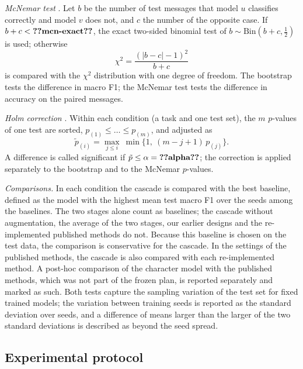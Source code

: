 \emph{McNemar test} \cite{mcnemar1947,dietterich1998}. Let $b$ be the number of test messages that model $u$ classifies correctly and model $v$ does not, and $c$ the number of the opposite case. If $b+c<\val{mcn-exact}$, the exact two-sided binomial test of $b\sim\mathrm{Bin}(b+c,\tfrac{1}{2})$ is used; otherwise
\begin{equation}\label{eq:mcnemar}
\chi^2=\frac{(|b-c|-1)^2}{b+c}
\end{equation}
is compared with the $\chi^2$ distribution with one degree of freedom. The bootstrap tests the difference in macro F1; the McNemar test tests the difference in accuracy on the paired messages.

\emph{Holm correction} \cite{holm1979,aickin1996}. Within each condition (a task and one test set), the $m$ $p$-values of one test are sorted, $p_{(1)}\le\dots\le p_{(m)}$, and adjusted as
\begin{equation}\label{eq:holm}
\tilde{p}_{(i)}=\max_{j\le i}\ \min\bigl\{1,\ (m-j+1)\,p_{(j)}\bigr\}.
\end{equation}
A difference is called significant if $\tilde{p}\le\alpha=\val{alpha}$; the correction is applied separately to the bootstrap and to the McNemar $p$-values.

\emph{Comparisons.} In each condition the cascade is compared with the best baseline, defined as the model with the highest mean test macro F1 over the  seeds among the baselines. The two stages alone count as baselines; the cascade without augmentation, the average of the two stages, our earlier designs and the re-implemented published methods do not. Because this baseline is chosen on the test data, the comparison is conservative for the cascade. In the settings of the published methods, the cascade is also compared with each re-implemented method. A post-hoc comparison of the character model with the published methods, which was not part of the frozen plan, is reported separately and marked as such. Both tests capture the sampling variation of the test set for fixed trained models; the variation between training seeds is reported as the standard deviation over seeds, and a difference of means larger than the larger of the two standard deviations is described as beyond the seed spread.

\subsection{Experimental protocol}\label{sec:protocol}

